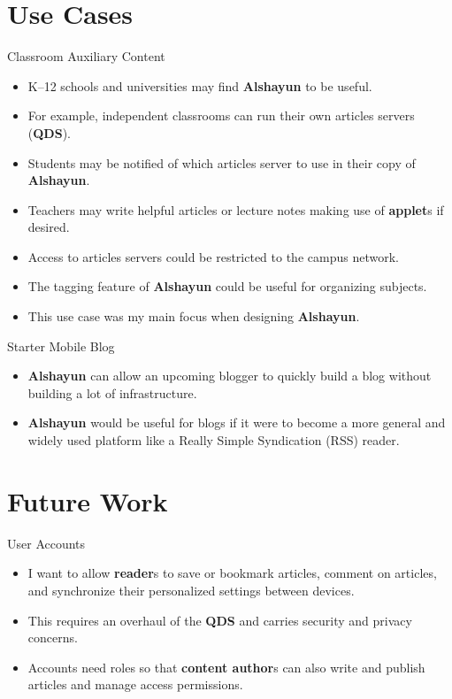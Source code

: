 \documentclass{beamer}
\begin{document}
\section{Use Cases}

\begin{frame}{Classroom Auxiliary Content}
    \begin{itemize}
        \item K--12 schools and universities may find \textbf{Alshayun} to be
            useful.
        \item For example, independent classrooms can run their own articles
            servers (\textbf{QDS}).
        \item Students may be notified of which articles server to use in their
            copy of \textbf{Alshayun}.
        \item Teachers may write helpful articles or lecture notes making use of
            \textbf{applet}s if desired.
        \item Access to articles servers could be restricted to the campus
            network.
        \item The tagging feature of \textbf{Alshayun} could be useful for
            organizing subjects.
        \item This use case was my main focus when designing \textbf{Alshayun}.
    \end{itemize}
\end{frame}

\begin{frame}{Starter Mobile Blog}
    \begin{itemize}
        \item \textbf{Alshayun} can allow an upcoming blogger to quickly build a
            blog without building a lot of infrastructure.
        \item \textbf{Alshayun} would be useful for blogs if it were to become a
            more general and widely used platform like a Really Simple
            Syndication (RSS) reader.
    \end{itemize}
\end{frame}

\section{Future Work}

\begin{frame}{User Accounts}
    \begin{itemize}
        \item I want to allow \textbf{reader}s to save or bookmark articles,
            comment on articles, and synchronize their personalized settings
            between devices.
        \item This requires an overhaul of the \textbf{QDS} and carries security
            and privacy concerns.
        \item Accounts need roles so that \textbf{content author}s can also
            write and publish articles and manage access permissions.
    \end{itemize}
\end{frame}
\end{document}
